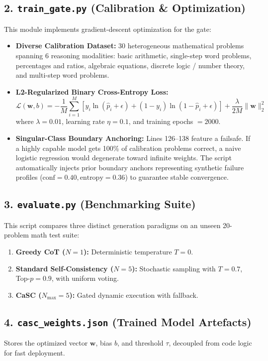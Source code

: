 \documentclass[11pt,a4paper]{article}
\begin{document}
\subsection{2. \texttt{train\_gate.py} (Calibration \& Optimization)}
This module implements gradient-descent optimization for the gate:
\begin{itemize}[leftmargin=*]
    \item \textbf{Diverse Calibration Dataset:} 30 heterogeneous mathematical problems spanning 6 reasoning modalities: basic arithmetic, single-step word problems, percentages and ratios, algebraic equations, discrete logic / number theory, and multi-step word problems.
    \item \textbf{L2-Regularized Binary Cross-Entropy Loss:}
    \begin{equation}
        \mathcal{L}(\mathbf{w}, b) = -\frac{1}{M}\sum_{i=1}^{M} \left[ y_i \ln(\hat{p}_i + \epsilon) + (1 - y_i)\ln(1 - \hat{p}_i + \epsilon) \right] + \frac{\lambda}{2M} \|\mathbf{w}\|_2^2
    \end{equation}
    where $\lambda = 0.01$, learning rate $\eta = 0.1$, and training epochs $= 2000$.
    \item \textbf{Singular-Class Boundary Anchoring:} Lines 126--138 feature a failsafe. If a highly capable model gets 100\% of calibration problems correct, a naive logistic regression would degenerate toward infinite weights. The script automatically injects prior boundary anchors representing synthetic failure profiles ($\text{conf}=0.40, \text{entropy}=0.36$) to guarantee stable convergence.
\end{itemize}

\subsection{3. \texttt{evaluate.py} (Benchmarking Suite)}
This script compares three distinct generation paradigms on an unseen 20-problem math test suite:
\begin{enumerate}
    \item \textbf{Greedy CoT ($N=1$):} Deterministic temperature $T=0$.
    \item \textbf{Standard Self-Consistency ($N=5$):} Stochastic sampling with $T=0.7$, Top-$p=0.9$, with uniform voting.
    \item \textbf{CaSC ($N_{\text{max}}=5$):} Gated dynamic execution with fallback.
\end{enumerate}

\subsection{4. \texttt{casc\_weights.json} (Trained Model Artefacts)}
Stores the optimized vector $\mathbf{w}$, bias $b$, and threshold $\tau$, decoupled from code logic for fast deployment.
\end{document}
